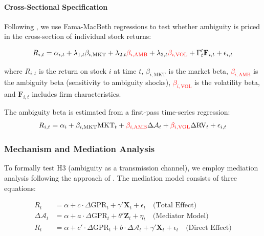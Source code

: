 \documentclass[preprint,12pt,authoryear]{elsarticle}
\begin{document}
\paragraph{Cross-Sectional Specification}
Following \citet{Fama1992Cross}, we use Fama-MacBeth regressions to test whether ambiguity is priced in the cross-section of individual stock returns:

\begin{equation}
R_{i,t} = \alpha_{i,t} + \lambda_{1,t} \beta_{i,\text{MKT}} + \lambda_{2,t} \textcolor{red}{\beta_{i,\text{AMB}}} + \lambda_{3,t} \textcolor{red}{\beta_{i,\text{VOL}}} + \Gamma_{t}' \mathbf{F}_{i,t} + \epsilon_{i,t}
\end{equation}

where $R_{i,t}$ is the return on stock $i$ at time $t$, $\beta_{i,\text{MKT}}$ is the market beta, \textcolor{red}{$\beta_{i,\text{AMB}}$} is the ambiguity beta (sensitivity to ambiguity shocks), \textcolor{red}{$\beta_{i,\text{VOL}}$} is the volatility beta, and $\mathbf{F}_{i,t}$ includes firm characteristics.

The ambiguity beta is estimated from a first-pass time-series regression:
\begin{equation}
R_{i,t} = \alpha_i + \beta_{i,\text{MKT}} \text{MKT}_t + \textcolor{red}{\beta_{i,\text{AMB}}} \Delta \mathcal{A}_t + \textcolor{red}{\beta_{i,\text{VOL}}} \Delta \text{RV}_t + \epsilon_{i,t}
\end{equation}

\subsubsection{Mechanism and Mediation Analysis}

To formally test H3 (ambiguity as a transmission channel), we employ mediation analysis following the approach of \citet{Baron1986Moderator}. The mediation model consists of three equations:

\begin{align}
R_{t} &= \alpha + c \cdot \Delta \text{GPR}_{t} + \gamma' \mathbf{X}_{t} + \epsilon_{t} \quad \text{(Total Effect)} \\
\Delta \mathcal{A}_{t} &= \alpha + a \cdot \Delta \text{GPR}_{t} + \theta' \mathbf{Z}_{t} + \eta_{t} \quad \text{(Mediator Model)} \\
R_{t} &= \alpha + c' \cdot \Delta \text{GPR}_{t} + b \cdot \Delta \mathcal{A}_{t} + \gamma' \mathbf{X}_{t} + \epsilon_{t} \quad \text{(Direct Effect)}
\end{align}
\end{document}
